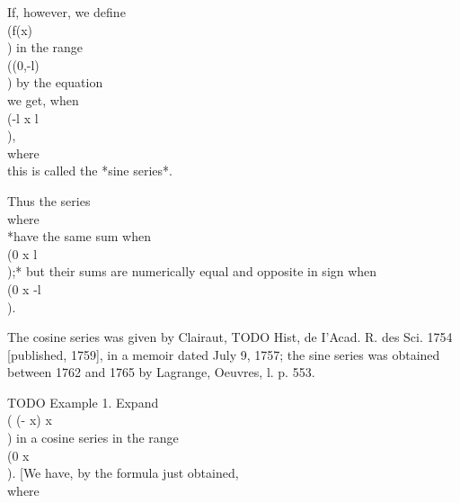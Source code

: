 If, however, we define \\(f(x)\\) in the range \\((0,-l)\\) by the equation
\\[ 
f(-x) = -f(\wandwtypo{-}{}x),\index{Odd functions}
\\] 
%
%
we get, when \\(-l \leq x \leq l\\),
\\[ 
\frac{1}{2} \left\{ f(x+0) + f(x-0) \right\}
=
\sum_{n=1}^{\infty} b_{n} \sin \frac{n \pi x}{l},
\\] 
where
\\[ 
l b_{n}
=
2 \! \int_{0}^{l}\! f(t) \sin \frac{n \pi t}{l} \, d t;
\\] 
this is called the *sine series*.

Thus the series
\\[ 
\frac{1}{2} a_{0}
+
\sum_{n=1}^{\infty} a_{n} \cos \frac{n \pi x}{l},
\quad
\sum_{n=1}^{\infty} b_{n} \sin \frac{n \pi x}{l},
\\] 
where
\\[ 
\frac{1}{2} l a_{n}
=
\int_{0}^{l}\! f(t) \cos \frac{n \pi t}{l} \, d t,
\quad
\frac{1}{2} l b_{n}
=
\int_{0}^{l}\! f(t) \sin \frac{n \pi t}{l} \, d t,
\\] 
*have the same sum when \\(0 \leq x \leq l\\);*
but their sums are numerically
equal and opposite in sign when \\(0 \geq x \geq -l\\).

The cosine series was given by Clairaut, TODO Hist, de I'Acad. R. des Sci.
1754 [published, 1759], in a memoir dated July 9, 1757; the sine
series was obtained between 1762 and 1765 by Lagrange, Oeuvres, l. p.
553.

TODO Example 1. Expand \\( (\pi - x) \sin x\\) in a cosine series in the range
\\(0 \leq x \leq \pi\\).
[We have, by the formula just obtained,
\\[ 
\frac{1}{2} (\pi - x) \sin x
=
\frac{1}{2} a_{0}
+ \sum_{n=1}^{\infty} a_{n} \cos nx,
\\] 
where
\\[ 
\frac{1}{2} \pi a_{n}
=
\int_{0}^{\pi}\! \frac{1}{2} (\pi - x) \sin x \cos nx \, d x.
\\] 

